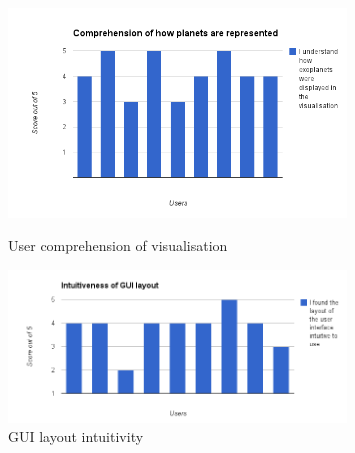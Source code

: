 \begin{figure}[h!]
  \centering
      \includegraphics[width=0.8\textwidth]{images/charts/chart_4.png}
  \caption{User comprehension of visualisation}  
    \label{fig:chart4}
      \includegraphics[width=0.8\textwidth]{images/charts/chart_5.png}
  \caption{GUI layout intuitivity}  
    \label{fig:chart5}
\end{figure}

